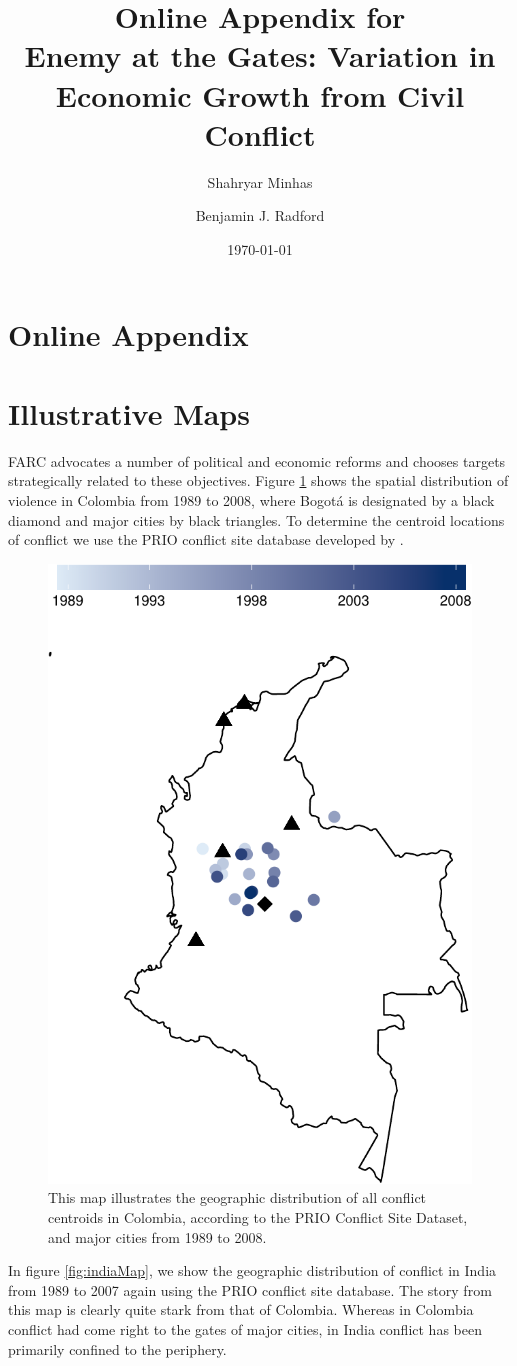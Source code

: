 \documentclass[12pt,onesided]{amsart}
\title[Enemy at the Gates]{Online Appendix for \\ Enemy at the Gates: Variation in Economic Growth from Civil Conflict}
\date{\today}
\author[Minhas]{Shahryar Minhas}
\author[Radford]{Benjamin J. Radford}
\begin{document}
\maketitle

\newpage
\newpage\setcounter{page}{1} 

\newpage
\section*{Online Appendix}
\label{online_appendix}

\section{Illustrative Maps}
\label{maps}

FARC advocates a number of political and economic reforms and chooses targets strategically related to these objectives. Figure \ref{fig:colombiaMap} shows the spatial distribution of violence in Colombia from 1989 to 2008, where Bogot\'{a} is designated by a black diamond and major cities by black triangles. To determine the centroid locations of conflict we use the PRIO conflict site database developed by \citet{hallberg:2012}. 

\begin{figure}[ht]
	\centering
	\includegraphics[width=.45\textwidth]{Graphics/colombiaMap-crop}
	\caption{This map illustrates the geographic distribution of all conflict centroids in Colombia, according to the PRIO Conflict Site Dataset, and major cities from 1989 to 2008.}
	\label{fig:colombiaMap}
\end{figure}

\newpage
In figure \ref{fig:indiaMap}, we show the geographic distribution of conflict in India from 1989 to 2007 again using the PRIO conflict site database. The story from this map is clearly quite stark from that of Colombia. Whereas in Colombia conflict had come right to the gates of major cities, in India conflict has been primarily confined to the periphery.
\end{document}
